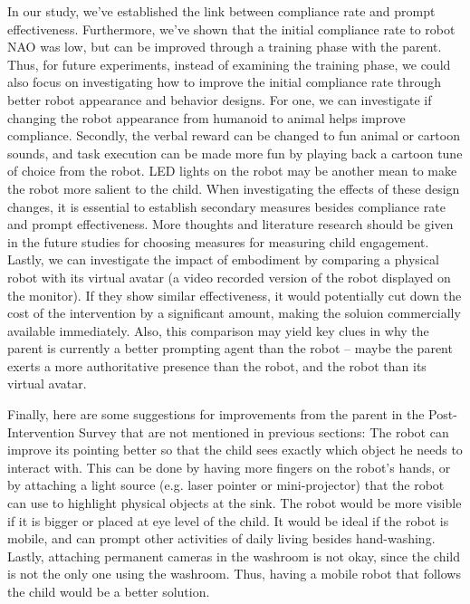 In our study, we've established the link between compliance rate and prompt effectiveness.  Furthermore, we've shown that the initial compliance rate to robot NAO was low, but can be improved through a training phase with the parent.  Thus, for future experiments, instead of examining the training phase, we could also focus on investigating how to improve the initial compliance rate through better robot appearance and behavior designs.  For one, we can investigate if changing the robot appearance from humanoid to animal helps improve compliance.  Secondly, the verbal reward can be changed to fun animal or cartoon sounds, and task execution can be made more fun by playing back a cartoon tune of choice from the robot.  LED lights on the robot may be another mean to make the robot more salient to the child.  When investigating the effects of these design changes, it is essential to establish secondary measures besides compliance rate and prompt effectiveness.  More thoughts and literature research should be given in the future studies for choosing measures for measuring child engagement.  Lastly, we can investigate the impact of embodiment by comparing a physical robot with its virtual avatar (a video recorded version of the robot displayed on the monitor).  If they show similar effectiveness, it would potentially cut down the cost of the intervention by a significant amount, making the soluion commercially available immediately.  Also, this comparison may yield key clues in why the parent is currently a better prompting agent than the robot -- maybe the parent exerts a more authoritative presence than the robot, and the robot than its virtual avatar.

Finally, here are some suggestions for improvements from the parent in the Post-Intervention Survey that are not mentioned in previous sections:  The robot can improve its pointing better so that the child sees exactly which object he needs to interact with.  This can be done by having more fingers on the robot's hands, or by attaching a light source (e.g. laser pointer or mini-projector) that the robot can use to highlight physical objects at the sink.  The robot would be more visible if it is bigger or placed at eye level of the child.  It would be ideal if the robot is mobile, and can prompt other activities of daily living besides hand-washing.  Lastly, attaching permanent cameras in the washroom is not okay, since the child is not the only one using the washroom.  Thus, having a mobile robot that follows the child would be a better solution.